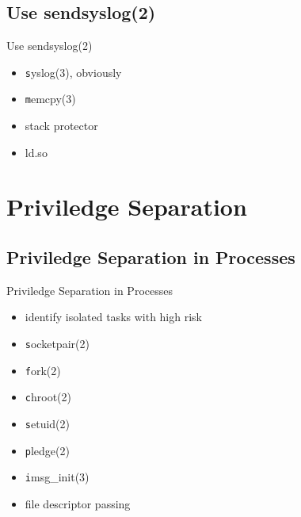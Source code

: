 \documentclass[14pt]{beamer}
\begin{document}
\subsection{Use sendsyslog(2)}
\begin{frame}{Use sendsyslog(2)}
\begin{itemize}
    \item {\texttt syslog(3)}, obviously
    \item {\texttt memcpy(3)}
    \item stack protector
    \item ld.so
\end{itemize}
\end{frame}

\section{Priviledge Separation}

\subsection{Priviledge Separation in Processes}
\begin{frame}{Priviledge Separation in Processes}
\begin{itemize}
    \item identify isolated tasks with high risk
    \item {\texttt socketpair(2)}
    \item {\texttt fork(2)}
    \item {\texttt chroot(2)}
    \item {\texttt setuid(2)}
    \item {\texttt pledge(2)}
    \item {\texttt imsg\_init(3)}
    \item file descriptor passing
\end{itemize}
\end{frame}
\end{document}
